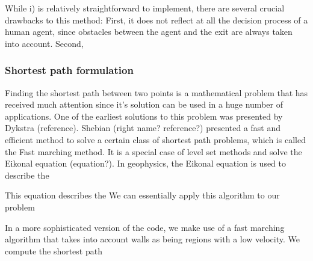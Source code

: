 \documentclass[11pt]{article}
\begin{document}
While i) is relatively straightforward to implement, there are several crucial drawbacks to this method: First, it does not reflect at all the decision process of a human agent, since obstacles between the agent and the exit are always taken into account. Second, 

\subsubsection{Shortest path formulation}
Finding the shortest path between two points is a mathematical problem that has received much attention since it's solution can be used in a huge number of applications. One of the earliest solutions to this problem was presented by Dykstra (reference). Shebian (right name? reference?) presented a fast and efficient method to solve a certain class of shortest path problems, which  is called the Fast marching method. It is a special case of level set methods and solve the Eikonal equation (equation?). In geophysics, the Eikonal equation is used to describe the 

This equation describes the We can essentially apply this algorithm to our problem

In a more sophisticated version of the code, we make use of a fast marching algorithm that takes into account walls as being regions with a low velocity. We compute the shortest path
\end{document}
